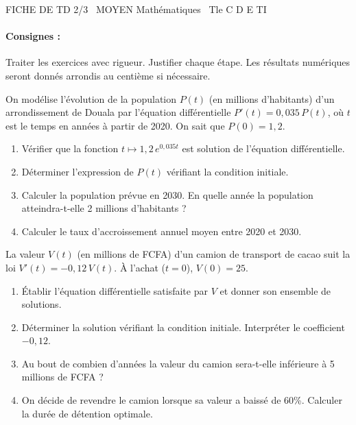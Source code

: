 \documentclass[11pt]{article}
\begin{document}
\begin{tcolorbox}[enhanced,colback=popink,colframe=popink,arc=10pt,boxrule=0pt,left=12pt,right=12pt,top=9pt,bottom=9pt]
{\color{white}\popxbold\small FICHE DE TD 2/3 \textbullet\ MOYEN \hfill Mathématiques \textbullet\ Tle C D E TI\par}
\end{tcolorbox}
\vspace{4pt}
\paragraph{Consignes :} Traiter les exercices avec rigueur. Justifier chaque étape. Les résultats numériques seront donnés arrondis au centième si nécessaire.

\begin{exercice}
On modélise l'évolution de la population $P(t)$ (en millions d'habitants) d'un arrondissement de Douala par l'équation différentielle $P'(t) = 0,035\, P(t)$, où $t$ est le temps en années à partir de 2020. On sait que $P(0) = 1,2$.
\begin{enumerate}
    \item Vérifier que la fonction $t \mapsto 1,2\, e^{0,035t}$ est solution de l'équation différentielle.
    \item Déterminer l'expression de $P(t)$ vérifiant la condition initiale.
    \item Calculer la population prévue en 2030. En quelle année la population atteindra-t-elle 2 millions d'habitants ?
    \item Calculer le taux d'accroissement annuel moyen entre 2020 et 2030.
\end{enumerate}
\end{exercice}

\begin{exercice}
La valeur $V(t)$ (en millions de FCFA) d'un camion de transport de cacao suit la loi $V'(t) = -0,12\, V(t)$. À l'achat ($t=0$), $V(0) = 25$.
\begin{enumerate}
    \item Établir l'équation différentielle satisfaite par $V$ et donner son ensemble de solutions.
    \item Déterminer la solution vérifiant la condition initiale. Interpréter le coefficient $-0,12$.
    \item Au bout de combien d'années la valeur du camion sera-t-elle inférieure à 5 millions de FCFA ?
    \item On décide de revendre le camion lorsque sa valeur a baissé de 60\%. Calculer la durée de détention optimale.
\end{enumerate}
\end{exercice}
\end{document}

